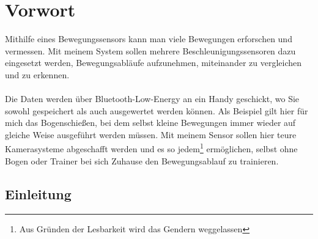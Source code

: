 \chapter[Vorwort]{Vorwort}

Mithilfe eines Bewegungssensors kann man viele 
Bewegungen erforschen und vermessen.
Mit meinem System sollen mehrere Beschleunigungssensoren 
dazu eingesetzt werden, Bewegungsabläufe aufzunehmen, 
miteinander zu vergleichen und zu erkennen.\\
\\
Die Daten werden über Bluetooth-Low-Energy an ein Handy 
geschickt, wo Sie sowohl gespeichert als auch ausgewertet 
werden können. Als Beispiel gilt hier für mich das Bogenschießen, 
bei dem selbst kleine Bewegungen immer wieder auf gleiche Weise 
ausgeführt werden müssen. Mit meinem Sensor sollen hier teure 
Kamerasysteme abgeschafft werden und es so jedem\footnote{Aus Gründen der Lesbarkeit wird das Gendern weggelassen} ermöglichen, 
selbst ohne Bogen oder Trainer bei sich Zuhause
den Bewegungsablauf zu trainieren.\\

\section{Einleitung}
